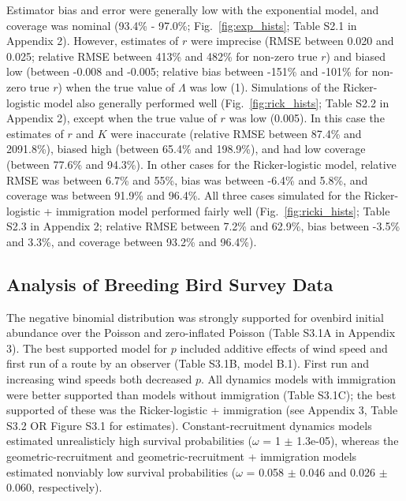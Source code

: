 \documentclass[12pt]{article}
\begin{document}
Estimator bias and error were generally low with the exponential model, and 
coverage was nominal (93.4\% - 97.0\%; Fig.~\ref{fig:exp_hists}; Table S2.1 in Appendix 2). 
However, estimates of $r$ were 
imprecise (RMSE between 0.020 and 0.025; relative RMSE between 413\% and 
482\% for non-zero true $r$) and biased low (between -0.008 and -0.005; relative bias between
-151\% and -101\% for non-zero true $r$) when the true value of $\Lambda$ was low (1). 
Simulations of the Ricker-logistic model also generally performed well (Fig.~\ref{fig:rick_hists}; 
Table S2.2 in Appendix 2), except when the true value of $r$ was low (0.005). In this case the 
estimates of $r$ and $K$ were inaccurate (relative RMSE between 87.4\% and 2091.8\%),
biased high (between 65.4\% and 198.9\%), and had low coverage (between 77.6\% and 94.3\%).
In other cases for the Ricker-logistic model, relative RMSE was between 6.7\%
and 55\%, bias was between -6.4\% and 5.8\%, and coverage was between
91.9\% and 96.4\%.  All three cases simulated for the Ricker-logistic + immigration model 
performed fairly well (Fig.~\ref{fig:ricki_hists}; Table S2.3 in Appendix 2; relative RMSE between 7.2\% 
and 62.9\%, bias between -3.5\% and 3.3\%, and coverage between
93.2\% and 96.4\%).
  
\subsection{Analysis of Breeding Bird Survey Data}


The negative binomial distribution was strongly supported for ovenbird
initial abundance over the Poisson and zero-inflated Poisson
(Table S3.1A in Appendix 3). %
The best supported model for $p$ included additive effects of wind speed
and first run of a route by an observer (Table S3.1B, model B.1). First run 
and increasing wind speeds both decreased $p$. All dynamics models 
with immigration were better supported than models without immigration 
(Table S3.1C); the best supported of these was the Ricker-logistic + immigration 
(see Appendix 3, Table S3.2 OR Figure S3.1 for estimates).
Constant-recruitment dynamics models estimated unrealisticly high
survival probabilities ($\omega$ = 1 $\pm$ 1.3e-05), whereas %
the geometric-recruitment and geometric-recruitment + immigration
models estimated nonviably low survival probabilities %
($\omega$ =
0.058 $\pm$ 0.046 and 0.026 $\pm$ 0.060, respectively). 
\end{document}
